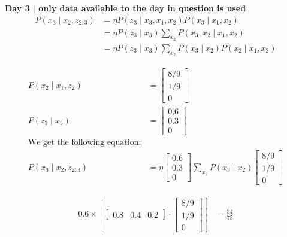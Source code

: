 \documentclass[answers]{exam}
\begin{document}
\begin{questions}
\begin{parts}
\begin{solution}
            \textbf{Day 3 $\mid$ only data available to the day in question is used}
            \begin{align*}
                P(x_3 \mid x_2, z_{2:3}) &= \eta P(z_3 \mid x_3, x_1, x_2) P(x_3 \mid x_1, x_2) \\
                &= \eta P(z_3 \mid x_3) \sum_{x_2} P(x_3, x_2 \mid x_1, x_2) \\
                &= \eta P(z_3 \mid x_3) \sum_{x_2} P(x_3 \mid x_2) P(x_2 \mid x_1, x_2)
            \end{align*}
            
            \begin{align*}
                P(x_2 \mid x_1, z_2) &= \begin{bmatrix}
                    8/9 \\
                    1/9 \\
                    0
                \end{bmatrix} \\
                P(z_3 \mid x_3) &= \begin{bmatrix}
                    0.6 \\
                    0.3 \\
                    0
                \end{bmatrix} \\
                \text{We get the following equation:} \\
                P(x_3 \mid x_2, z_{2:3}) &= \eta \begin{bmatrix}
                    0.6 \\
                    0.3 \\
                    0
                \end{bmatrix} \sum_{x_2} P(x_3 \mid x_2) \begin{bmatrix}
                    8/9 \\
                    1/9 \\
                    0
                \end{bmatrix}
            \end{align*}
            
            \begin{align*}
                0.6 \times \left[\begin{bmatrix} 0.8 & 0.4 & 0.2 \end{bmatrix} \cdot \begin{bmatrix}
                    8/9 \\
                    1/9 \\
                    0
                \end{bmatrix}\right] &= \frac{34}{75}
            \end{align*}
            

\end{solution}
\end{parts}
\end{questions}
\end{document}
